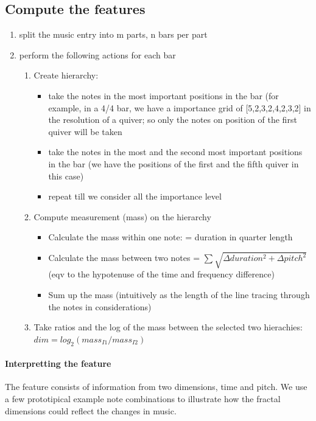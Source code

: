 \documentclass[acmsmall,10pt]{acmart}%
\begin{document}
 \subsection{Compute the features}
 \begin{enumerate}
 \item split the music entry into m parts, n bars per part
 
 \item perform the following actions for each bar

   \begin{enumerate}
   \item  Create hierarchy:
     \begin{itemize}
     \item  take the notes in the most important positions in the bar (for example,
      in a 4/4 bar, we have a importance grid of [5,2,3,2,4,2,3,2] in the
      resolution of a quiver; so only the notes on position of the first quiver
      will be taken
      \item take the notes in the most and the second most important positions in
      the bar (we have the positions of the first and the fifth quiver in this
      case)
      \item  repeat till we consider all the importance level
      \end{itemize}
    \item Compute measurement (mass) on the hierarchy
      
      \begin{itemize}
      \item  Calculate the mass within one note: = duration in quarter length
      \item  Calculate the mass between two notes =  $\sum \sqrt{\Delta duration^2 +
        \Delta pitch^2}$ (eqv to the hypotenuse of the time and frequency
      difference)
      \item Sum up the mass (intuitively as the length of the line tracing through
      the notes in considerations)

      \end{itemize}
   \item  Take ratios and the log of the mass between the selected two hierachies: $dim = log_2(mass_{I1}/mass_{I2}) $

   \end{enumerate}
 
     
 \end{enumerate}
 
\paragraph{Interpretting the feature}
The feature consists of information from two dimensions, time and pitch. We use
a few prototipical example note combinations to illustrate how the fractal
dimensions could reflect the changes in music.
\end{document}
